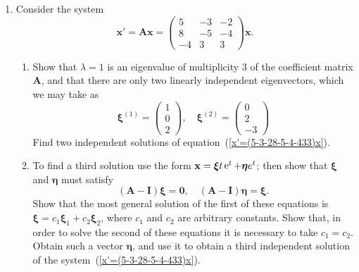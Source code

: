 {\begin{Exercise}
\begin{enumerate}
\begin{enumerate}
      \[
      (\mathbf{A} - 2 \mathbf{I}) \boldsymbol{\xi} = \mathbf{0}, \quad 
      (\mathbf{A} - 2 \mathbf{I}) \boldsymbol{\eta} = \boldsymbol{\xi}, \quad
      (\mathbf{A} - 2 \mathbf{I}) \boldsymbol{\zeta} = \boldsymbol{\eta}.
      \]
      The first two equations can be taken to coincide with those obtained
      in part (iii). Solve the third equation, and write down a third
      independent solution of the system~(\ref{eqn x'=(11121-1-324)x}).
    \end{enumerate}
  \item
    Consider the system
    \begin{equation}
      \label{x'=(5-3-28-5-4-433)x}
      \mathbf{x}' = \mathbf{A} \mathbf{x} 
      = \begin{pmatrix}
        5 & -3 & -2\\
        8 & -5 & -4\\
        -4 & 3 & 3
      \end{pmatrix} \mathbf{x}.
    \end{equation}
    \begin{enumerate}
    \item
      Show that $\lambda = 1$ is an eigenvalue of multiplicity $3$ of the
      coefficient matrix $\mathbf{A}$, and that there are only two linearly independent
      eigenvectors, which we may take as
      \[
      \boldsymbol{\xi}^{(1)} = \begin{pmatrix}
        1 \\
        0 \\
        2
      \end{pmatrix}, \quad
      \boldsymbol{\xi}^{(2)} = \begin{pmatrix}
        0 \\
        2 \\
        -3
      \end{pmatrix}
      \]
      Find two independent solutions of equation~(\ref{x'=(5-3-28-5-4-433)x}).
    \item 
      To find a third solution use the form $\mathbf{x} = \boldsymbol{\xi} t \mathop{\mathrm{e}}\nolimits^t + \boldsymbol{\eta} e^t$;
      then show that $\boldsymbol{\xi}$ and $\boldsymbol{\eta}$ must satisfy 
      \[
      (\mathbf{A} - \mathbf{I}) \boldsymbol{\xi} = \mathbf{0}, \quad 
      (\mathbf{A} - \mathbf{I}) \boldsymbol{\eta} = \boldsymbol{\xi}.
      \]
      Show that the most general solution of the first of these equations is
      $\boldsymbol{\xi} = c_1 \boldsymbol{\xi}_1 + c_2 \boldsymbol{\xi}_2$, where $c_1$ and $c_2$ are arbitrary constants.
      Show that, in order to solve the second of these equations it is necessary 
      to take $c_1 = c_2$. Obtain such a vector $\boldsymbol{\eta}$, and use it to obtain 
      a third independent solution of the system~(\ref{x'=(5-3-28-5-4-433)x}).
    \end{enumerate}
  \end{enumerate}


\end{Exercise}}
